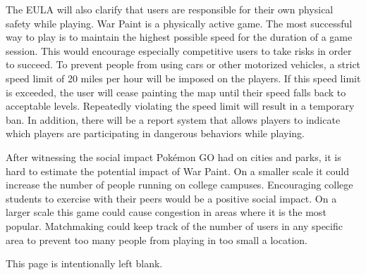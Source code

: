 \documentclass[12pt,listof=totoc,toc=sectionentrywithdots]{scrartcl}
\begin{document}
The EULA will also clarify that users are responsible for their own physical safety while playing. War Paint is a physically active game. The most successful way to play is to maintain the highest possible speed for the duration of a game session. This would encourage especially competitive users to take risks in order to succeed. To prevent people from using cars or other motorized vehicles, a strict speed limit of 20 miles per hour will be imposed on the players. If this speed limit is exceeded, the user will cease painting the map until their speed falls back to acceptable levels. Repeatedly violating the speed limit will result in a temporary ban. In addition, there will be a report system that allows players to indicate which players are participating in dangerous behaviors while playing.

After witnessing the social impact Pok\'emon GO had on cities and parks, it is hard to estimate the potential impact of War Paint. On a smaller scale it could increase the number of people running on college campuses. Encouraging college students to exercise with their peers would be a positive social impact. On a larger scale this game could cause congestion in areas where it is the most popular. Matchmaking could keep track of the number of users in any specific area to prevent too many people from playing in too small a location.

\clearpage
{}
\vspace*{\fill}
\centering
This page is intentionally left blank.
\vspace*{\fill}
%
\end{document}
